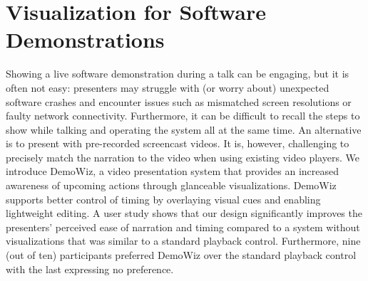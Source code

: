 \chapter{Visualization for Software Demonstrations}

Showing a live software demonstration during a talk can be engaging, but it is often not easy: presenters may struggle with (or worry about) unexpected software crashes and encounter issues such as mismatched screen resolutions or faulty network connectivity. Furthermore, it can be difficult to recall the steps to show while talking and operating the system all at the same time. An alternative is to present with pre-recorded screencast videos. It is, however, challenging to precisely match the narration to the video when using existing video players. We introduce DemoWiz, a video presentation system that provides an increased awareness of upcoming actions through glanceable visualizations. DemoWiz supports better control of timing by overlaying visual cues and enabling lightweight editing. A user study shows that our design significantly improves the presenters’ perceived ease of narration and timing compared to a system without visualizations that was similar to a standard playback control. Furthermore, nine (out of ten) participants preferred DemoWiz over the standard playback control with the last expressing no preference.








